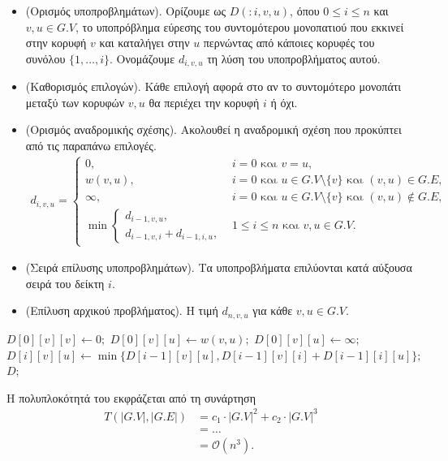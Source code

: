 \documentclass{article}
\makeatletter
\newenvironment{yellowalgo}{
    \begin{tcolorbox}[colback=myyellow, colframe=myyellow, boxrule=0.5pt]
    \begin{algorithmic}[1]
    \setcounter{ALG@line}{-1}
}{
    \end{algorithmic}
    \end{tcolorbox}
}
\makeatother
\begin{document}
\begin{itemize}
    \item (Ορισμός υποπροβλημάτων). Ορίζουμε ως $D(:i, v, u)$, όπου $0 \leq i \leq n$  και $v, u \in G.V$, το υποπρόβλημα εύρεσης του συντομότερου μονοπατιού που εκκινεί στην κορυφή $v$ 
    και καταλήγει στην $u$ περνώντας από κάποιες κορυφές του συνόλου $\{1, \dots, i\}$. Ονομάζουμε $d_{i, v, u}$ τη λύση του υποπροβλήματος αυτού.
    \item (Καθορισμός επιλογών). Κάθε επιλογή αφορά στο αν το συντομότερο μονοπάτι μεταξύ των κορυφών $v, u$ θα περιέχει την κορυφή $i$ ή όχι.
    \item  (Ορισμός αναδρομικής σχέσης). Ακολουθεί η αναδρομική σχέση που προκύπτει από τις παραπάνω επιλογές.
    \begin{align*}
        d_{i, v, u} = 
        \begin{cases}
            0, & i = 0 \text{ και } v = u, \\
            w(v, u), & i = 0 \text{ και } u \in G.V \setminus \{v\} \text{ και } (v, u) \in G.E, \\
            \infty,  & i = 0 \text{ και } u \in G.V \setminus \{v\} \text{ και } (v, u) \notin G.E, \\
            \min   
            \begin{cases}
                d_{i - 1, v, u}, \\
                d_{i - 1, v, i} + d_{i - 1, i, u}, 
            \end{cases}
            & 1 \leq i \leq n \text{ και } v, u \in G.V.
        \end{cases} 
    \end{align*}
    \item  (Σειρά επίλυσης υποπροβλημάτων). Τα υποπροβλήματα επιλύονται κατά αύξουσα σειρά του δείκτη $i$.
    \item (Επίλυση αρχικού προβλήματος). Η τιμή $d_{n, v, u}$ για κάθε $v, u \in G.V$.
\end{itemize}

\begin{yellowalgo}
            \State $D[0][v][v] \gets 0;$
                    \State $D[0][v][u] \gets w(v, u);$
                \Else     
                    \State $D[0][v][u] \gets \infty;$
                \EndIf
            \EndFor
        \EndFor
                    \State $D[i][v][u] \gets \min\{D[i - 1][v][u], D[i - 1][v][i] + D[i - 1][i][u]\};$
                \EndFor
            \EndFor
        \EndFor
        \State \Return $D;$
    \EndFunction
\end{yellowalgo}
\noindent
Η πολυπλοκότητά του εκφράζεται από τη συνάρτηση 
\begin{align*}
    T(|G.V|, |G.E|) &= c_1 \cdot |G.V|^2 + c_2 \cdot |G.V|^3 \\
    &= \dots \\
    &= \mathcal{O}(n^3).
\end{align*}
\end{document}
